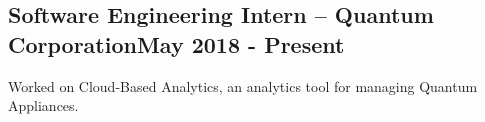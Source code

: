 \documentclass[../Resume.tex]{subfiles}
\begin{document}
    \subsection{Software Engineering Intern -- Quantum Corporation\null\hfill May 2018 - Present}
    \par Worked on Cloud-Based Analytics, an analytics tool for managing Quantum Appliances.
    \vspace*{-2mm}
\end{document}
